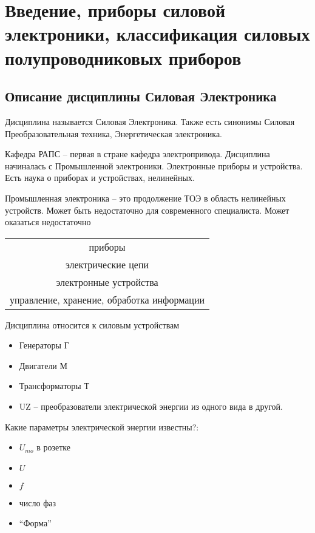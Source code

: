 \chapter{Введение, приборы силовой электроники, классификация силовых полупроводниковых приборов}
\section{Описание дисциплины Силовая Электроника}
Дисциплина называется Силовая Электроника. Также есть синонимы
Силовая Преобразовательная техника, Энергетическая электроника.

Кафедра РАПС -- первая в стране кафедра электропривода.
Дисциплина начиналась с Промышленной электроники. Электронные приборы и
устройства. Есть наука о приборах и устройствах, нелинейных.

Промышленная электроника -- это продолжение ТОЭ в область нелинейных
устройств.
Может быть недостаточно для современного специалиста. Может оказаться
недостаточно

\begin{tabular}{c}
  приборы\\
  электрические цепи\\
  электронные устройства\\
  управление, хранение, обработка информации
\end{tabular}


Дисциплина относится к силовым устройствам
\begin{itemize}
\item Генераторы Г
\item Двигатели М
\item Трансформаторы Т
\item UZ -- преобразователи электрической энергии из одного вида в другой.
\end{itemize}

Какие параметры электрической энергии известны?:
\begin{itemize}
\item $U_{mo}$ в розетке
\item $U$
\item $f$
\item число фаз
\item ``Форма''  
\end{itemize}  
  
